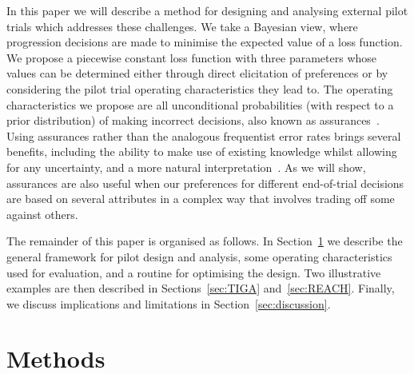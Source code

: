 \documentclass[AMA,STIX1COL]{WileyNJD-v2}
\begin{document}



In this paper we will describe a method for designing and analysing external pilot trials which addresses these challenges. We take a Bayesian view, where progression decisions are made to minimise the expected value of a loss function. We propose a piecewise constant loss function with three parameters whose values can be determined either through direct elicitation of preferences or by considering the pilot trial operating characteristics they lead to. The operating characteristics we propose are all unconditional probabilities (with respect to a prior distribution) of making incorrect decisions, also known as assurances~\cite{OHagan2005}. Using assurances rather than the analogous frequentist error rates brings several benefits, including the ability to make use of existing knowledge whilst allowing for any uncertainty, and a more natural interpretation~\cite{Crisp2018}. As we will show, assurances are also useful when our preferences for different end-of-trial decisions are based on several attributes in a complex way that involves trading off some against others.


The remainder of this paper is organised as follows. In Section~\ref{sec:methods} we describe the general framework for pilot design and analysis, some operating characteristics used for evaluation, and a routine for optimising the design. Two illustrative examples are then described in Sections~\ref{sec:TIGA} and~\ref{sec:REACH}. Finally, we discuss implications and limitations in Section~\ref{sec:discussion}.

\section{Methods}\label{sec:methods}
\end{document}
